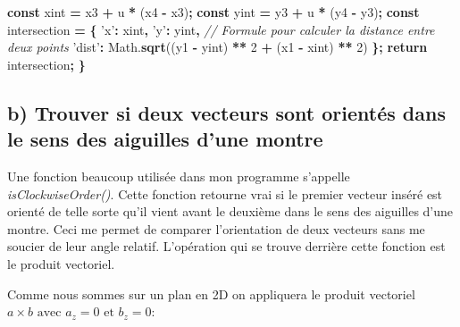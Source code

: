 \documentclass[11pt,french,a4paper,]{article}
\newenvironment{Shaded}{\begin{snugshade}}{\end{snugshade}}
\newcommand{\AttributeTok}[1]{\textcolor[rgb]{0.00,0.36,0.77}{\textbf{#1}}}
\newcommand{\CommentTok}[1]{\textcolor[rgb]{0.35,0.35,0.35}{\textit{#1}}}
\newcommand{\ControlFlowTok}[1]{\textcolor[rgb]{0.68,0.35,0.62}{\textbf{#1}}}
\newcommand{\DecValTok}[1]{\textcolor[rgb]{0.00,0.00,0.81}{#1}}
\newcommand{\KeywordTok}[1]{\textcolor[rgb]{0.68,0.35,0.62}{\textbf{#1}}}
\newcommand{\NormalTok}[1]{#1}
\newcommand{\OperatorTok}[1]{\textcolor[rgb]{0.81,0.36,0.00}{\textbf{#1}}}
\newcommand{\StringTok}[1]{\textcolor[rgb]{0.31,0.60,0.02}{#1}}
\newcommand{\VariableTok}[1]{\textcolor[rgb]{0.90,0.33,0.00}{#1}}
\begin{document}
\begin{Shaded}
\begin{Highlighting}[]
    \KeywordTok{const}\NormalTok{ xint }\OperatorTok{=}\NormalTok{ x3 }\OperatorTok{+}\NormalTok{ u }\OperatorTok{*}\NormalTok{ (x4 }\OperatorTok{-}\NormalTok{ x3)}\OperatorTok{;}
    \KeywordTok{const}\NormalTok{ yint }\OperatorTok{=}\NormalTok{ y3 }\OperatorTok{+}\NormalTok{ u }\OperatorTok{*}\NormalTok{ (y4 }\OperatorTok{-}\NormalTok{ y3)}\OperatorTok{;}
    \KeywordTok{const}\NormalTok{ intersection }\OperatorTok{=} \OperatorTok{\{}
        \StringTok{'x'}\OperatorTok{:}\NormalTok{ xint}\OperatorTok{,}
        \StringTok{'y'}\OperatorTok{:}\NormalTok{ yint}\OperatorTok{,}
            \CommentTok{// Formule pour calculer la distance entre deux points}
        \StringTok{'dist'}\OperatorTok{:} \VariableTok{Math}\NormalTok{.}\AttributeTok{sqrt}\NormalTok{((y1 }\OperatorTok{-}\NormalTok{ yint) }\OperatorTok{**} \DecValTok{2} \OperatorTok{+}\NormalTok{ (x1 }\OperatorTok{-}\NormalTok{ xint) }\OperatorTok{**} \DecValTok{2}\NormalTok{)}
    \OperatorTok{\};}
    \ControlFlowTok{return}\NormalTok{ intersection}\OperatorTok{;}
\OperatorTok{\}}
\end{Highlighting}
\end{Shaded}

\hypertarget{b-trouver-si-deux-vecteurs-sont-orientuxe9s-dans-le-sens-des-aiguilles-dune-montre}{%
\subsection{b) Trouver si deux vecteurs sont orientés dans le sens des
aiguilles d'une
montre}\label{b-trouver-si-deux-vecteurs-sont-orientuxe9s-dans-le-sens-des-aiguilles-dune-montre}}

Une fonction beaucoup utilisée dans mon programme s'appelle
\emph{isClockwiseOrder()}. Cette fonction retourne vrai si le premier
vecteur inséré est orienté de telle sorte qu'il vient avant le deuxième
dans le sens des aiguilles d'une montre. Ceci me permet de comparer
l'orientation de deux vecteurs sans me soucier de leur angle relatif.
L'opération qui se trouve derrière cette fonction est le produit
vectoriel.

Comme nous sommes sur un plan en 2D on appliquera le produit vectoriel
\(a \times b \text{ avec } a_z = 0 \text{ et } b_z = 0\):
\end{document}

